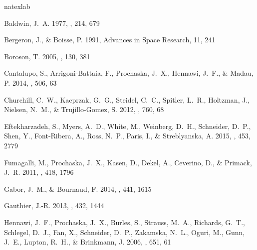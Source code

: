 \documentclass[iop]{emulateapj}
\begin{document}
%
%

\begin{thebibliography}{45}
\expandafter\ifx\csname natexlab\endcsname\relax\def\natexlab#1{#1}\fi

{Baldwin}, J.~A. 1977, \apj, 214, 679

{Bergeron}, J., \& {Boisse}, P. 1991, Advances in Space Research, 11, 241

{Boroson}, T. 2005, \aj, 130, 381

{Cantalupo}, S., {Arrigoni-Battaia}, F., {Prochaska}, J.~X., {Hennawi}, J.~F.,
  \& {Madau}, P. 2014, \nat, 506, 63

{Churchill}, C.~W., {Kacprzak}, G.~G., {Steidel}, C.~C., {Spitler}, L.~R.,
  {Holtzman}, J., {Nielsen}, N.~M., \& {Trujillo-Gomez}, S. 2012, \apj, 760, 68

{Eftekharzadeh}, S., {Myers}, A.~D., {White}, M., {Weinberg}, D.~H.,
  {Schneider}, D.~P., {Shen}, Y., {Font-Ribera}, A., {Ross}, N.~P., {Paris},
  I., \& {Streblyanska}, A. 2015, \mnras, 453, 2779

{Fumagalli}, M., {Prochaska}, J.~X., {Kasen}, D., {Dekel}, A., {Ceverino}, D.,
  \& {Primack}, J.~R. 2011, \mnras, 418, 1796

{Gabor}, J.~M., \& {Bournaud}, F. 2014, \mnras, 441, 1615

{Gauthier}, J.-R. 2013, \mnras, 432, 1444

{Hennawi}, J.~F., {Prochaska}, J.~X., {Burles}, S., {Strauss}, M.~A.,
  {Richards}, G.~T., {Schlegel}, D.~J., {Fan}, X., {Schneider}, D.~P.,
  {Zakamska}, N.~L., {Oguri}, M., {Gunn}, J.~E., {Lupton}, R.~H., \&
  {Brinkmann}, J. 2006, \apj, 651, 61


\end{thebibliography}
\end{document}

